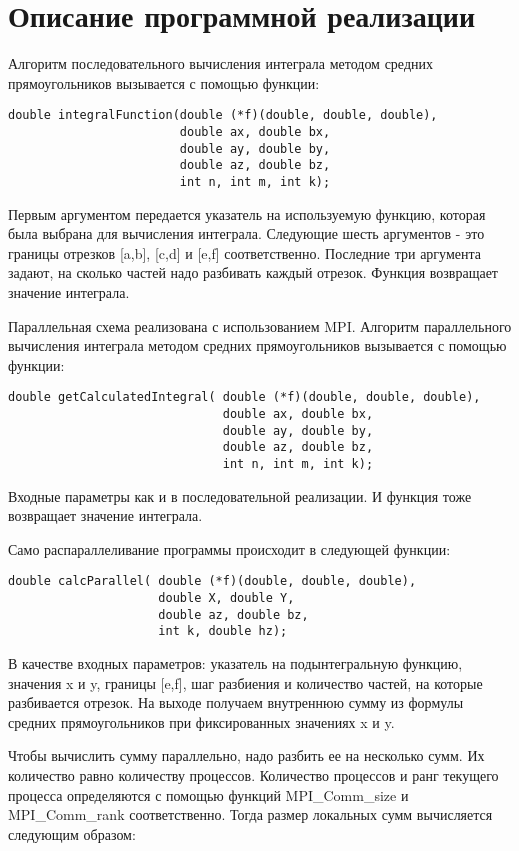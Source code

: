 \documentclass{report}
\begin{document}
\section*{Описание программной реализации}
Алгоритм последовательного вычисления интеграла методом средних прямоугольников вызывается с помощью функции:
\begin{lstlisting}
double integralFunction(double (*f)(double, double, double),
                        double ax, double bx,
                        double ay, double by,
                        double az, double bz,
                        int n, int m, int k);
\end{lstlisting}
\par Первым аргументом передается указатель на используемую функцию, которая была выбрана для вычисления интеграла. Следующие шесть аргументов - это границы отрезков [a,b], [c,d] и [e,f] соответственно. Последние три аргумента задают, на сколько частей надо разбивать каждый отрезок. Функция возвращает значение интеграла.
\par Параллельная схема реализована с использованием MPI. Алгоритм параллельного вычисления интеграла методом средних прямоугольников вызывается с помощью функции:
\begin{lstlisting}
double getCalculatedIntegral( double (*f)(double, double, double),
                              double ax, double bx,
                              double ay, double by,
                              double az, double bz,
                              int n, int m, int k);
\end{lstlisting}
\par Входные параметры как и в последовательной реализации. И функция тоже возвращает значение интеграла.
\par Само распараллеливание программы происходит в следующей функции:
\begin{lstlisting}
double calcParallel( double (*f)(double, double, double),
                     double X, double Y,
                     double az, double bz,
                     int k, double hz);
\end{lstlisting}
\par В качестве входных параметров: указатель на подынтегральную функцию, значения x и y, границы [e,f], шаг разбиения и количество частей, на которые разбивается отрезок. На выходе получаем внутреннюю сумму из формулы средних прямоугольников при фиксированных значениях x и y.
\par Чтобы вычислить сумму параллельно, надо разбить ее на несколько сумм. Их количество равно количеству процессов. Количество процессов и ранг текущего процесса определяются с помощью функций MPI\_Comm\_size и MPI\_Comm\_rank соответственно. Тогда размер локальных сумм вычисляется следующим образом:
\end{document}
